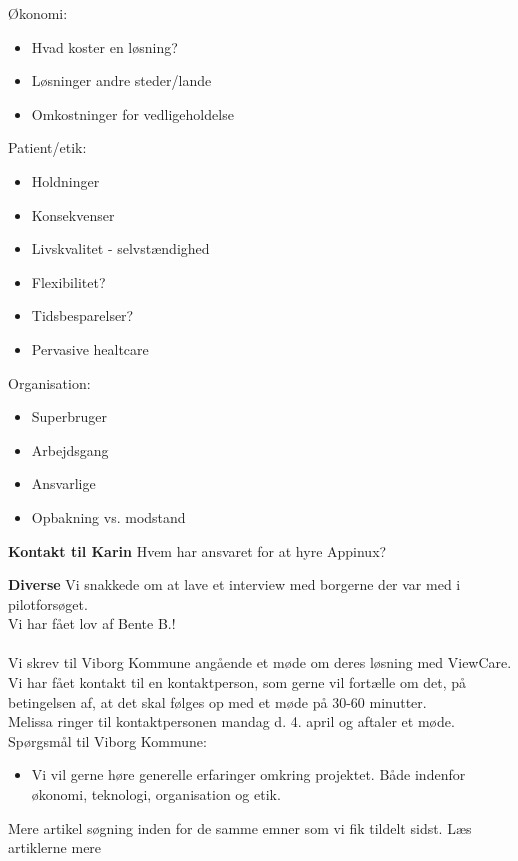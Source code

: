 Økonomi:
\begin{itemize}
	\item Hvad koster en løsning?
	\item Løsninger andre steder/lande
	\item Omkostninger for vedligeholdelse
\end{itemize}

Patient/etik:
\begin{itemize}
	\item Holdninger
	\item Konsekvenser
	\item Livskvalitet - selvstændighed
	\item Flexibilitet?
	\item Tidsbesparelser?
	\item Pervasive healtcare 
\end{itemize}

Organisation:
\begin{itemize}
	\item Superbruger
	\item Arbejdsgang
	\item Ansvarlige
	\item Opbakning vs. modstand
\end{itemize}


\textbf{Kontakt til Karin}
Hvem har ansvaret for at hyre Appinux?


\textbf{Diverse}
Vi snakkede om at lave et interview med borgerne der var med i pilotforsøget.\\
Vi har fået lov af Bente B.!\\\\
Vi skrev til Viborg Kommune angående et møde om deres løsning med ViewCare. Vi har fået kontakt til en kontaktperson, som gerne vil fortælle om det, på betingelsen af, at det skal følges op med et møde på 30-60 minutter. \\
Melissa ringer til kontaktpersonen mandag d. 4. april og aftaler et møde.\\
Spørgsmål til Viborg Kommune:
\begin{itemize}
	\item Vi vil gerne høre generelle erfaringer omkring projektet. Både indenfor økonomi, teknologi, organisation og etik.
\end{itemize} 
Mere artikel søgning inden for de samme emner som vi fik tildelt sidst. Læs artiklerne mere 